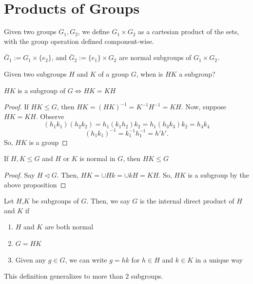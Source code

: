 \section{Products of Groups}

\begin{defn}
    Given two groups $G_1,G_2$, we define $G_1 \times G_2$ as a cartesian product of the sets, with the group operation defined component-wise.
\end{defn}

\begin{notebox*}
    $\bar G_1 := G_1 \times \{e_2\}$, and $\bar G_2:= \{e_1\} \times G_2$ are normal subgroups of $G_1 \times G_2$.
\end{notebox*}

\begin{notebox*}[Question]
    Given two subgroups $H$ and $K$ of a group $G$, when is $HK$ a subgroup?
\end{notebox*}

\begin{prop}
    $HK$ is a subgroup of $G \iff HK = KH$
\end{prop}
\begin{proof}
    If $HK \leq G$, then $HK=(HK)^{-1}=K^{-1}H^{-1}=KH$. Now, suppose $HK=KH$. Observe
    $$(h_1k_1)(h_2k_2)=h_1(k_1h_2)k_2=h_1(h_3k_3)k_2=h_4k_4$$
    $$(h_1k_1)^{-1}=k_1^{-1}h_1^{-1}=h'k'.$$
    So, $HK$ is a group
\end{proof}

\begin{cor}
    If $H,K \leq G$ and $H$ or $K$ is normal in $G$, then $HK \leq G$
\end{cor}

\begin{proof}
    Say $H \lhd G$. Then, $HK= \cup Hk=\cup kH=KH$. So, $HK$ is a subgroup by the above proposition
\end{proof}

\begin{defn}
    Let $H$,$K$ be subgroups of $G$. Then, we say $G$ is the internal direct product of $H$ and $K$ if
    \begin{enumerate}
        \item[(i)] $H$ and $K$ are both normal
        \item[(ii)] $G=HK$
        \item[(iii)] Given any $g \in G$, we can write $g=hk$ for $h \in H$ and $k \in K$ in a unique way
    \end{enumerate}
    This definition generalizes to more than $2$ subgroups.
\end{defn}

